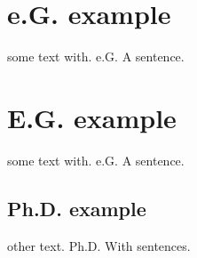 \section{e.G. example}
some text with. e.G. A sentence.

\section{E.G. example}
some text with. e.G. A sentence.

\subsection{Ph.D. example}
other text. Ph.D. With sentences.
